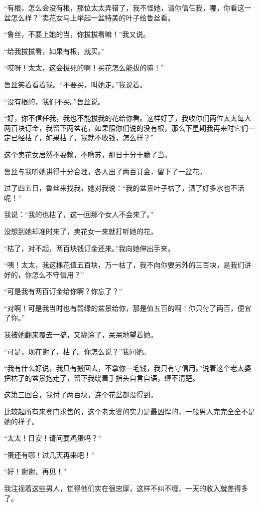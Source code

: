 \par “有根，怎么会没有根，那位太太弄错了，我不怪她，请你信任我，哪，你看这一盆怎么样？”卖花女马上举起一盆特美的叶子给鲁丝看。
\par “鲁丝，不要上她的当，你拔拔看嘛！”我又说。
\par “给我拔拔看，如果有根，就买。”
\par “哎呀！太太，这会拔死的啊！买花怎么能拔的嘛！”
\par 鲁丝笑着看着我。“不要买，叫她走。”我说着。
\par “没有根的，我们不买。”鲁丝说。
\par “好，你不信任我，我也不能拔我的花给你看。这样好了，我收你们两位太太每人两百块订金，我留下两盆花，如果照你们说的没有根，那么下星期我再来时它们一定已经枯了，如果枯了，我就不收钱，怎么样？”
\par 这个卖花女居然不耍赖，不噜苏，那日十分干脆了当。
\par 鲁丝与我听她讲得十分合理，各人出了两百订金，留下了一盆花。
\par 过了四五日，鲁丝来找我，她对我说：“我的盆景叶子枯了，洒了好多水也不活呢！”
\par 我说：“我的也枯了，这一回那个女人不会来了。”
\par 没想到她却准时来了，卖花女一来就打听她的花。
\par “枯了，对不起，两百块钱订金还来。”我向她伸出手来。
\par “咦！太太，我这棵花值五百块，万一枯了，我不向你要另外的三百块，是我们讲好的，你怎么不守信用？”
\par “可是我有两百订金给你啊？你忘了？”
\par “对啊！可是我当时也有碧绿的盆景给你，那是值五百的啊！你只付了两百，便宜了你。”
\par 我被她翻来覆去一搞，又糊涂了，呆呆地望着她。
\par “可是，现在谢了，枯了。你怎么说？”我问她。
\par “我有什么好说，我只有搬回去，不拿你一毛钱，我只有守信用。”说着这个老太婆把枯了的盆景抱走了，留下我绕着手指头自言自语，缠不清楚。
\par 这第三回合，我付了两百块，连个花盆都没得到。
\par 比较起所有来登门求售的，这个老太婆的实力是最凶悍的，一般男人完完全全不是她的样子。
\par “太太！日安！请问要鸡蛋吗？”
\par “蛋还有哪！过几天再来吧！”
\par “好！谢谢，再见！”
\par 我注视着这些男人，觉得他们实在很忠厚，这样不纠不缠，一天的收入就差得多了。
